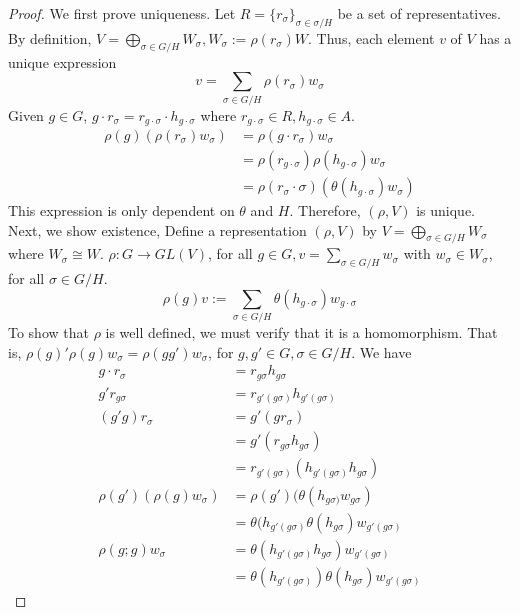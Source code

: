 \documentclass[letterpaper, leqno, 12pt]{article}
\newcommand {\repV} {(\rho,V)}
\theoremstyle{stdthm}
\theoremstyle{stddef}
\theoremstyle{stdnonum}
\theoremstyle{stdqands}
\theoremstyle{stdbold}
\begin{document}
\begin{proof}
We first prove uniqueness. Let $R = \{r_\sigma\}_{\sigma \in \sigma/H}$ be a set of representatives. By definition, $V = \bigoplus_{\sigma \in G/H} W_\sigma, W_\sigma := \rho(r_\sigma)W$. Thus, each element $v$ of $V$ has a unique expression
 \[ v = \sum_{\sigma \in G/H} \rho(r_\sigma) w_\sigma \]
Given $g \in G$, $g\cdot r_\sigma = r_{g\cdot \sigma} \cdot h_{g \cdot \sigma}$ where $r_{g\cdot \sigma} \in R, h_{g\cdot \sigma} \in A$.  
\begin{align*}
\rho(g)(\rho(r_\sigma)w_\sigma)  &= \rho(g\cdot r_\sigma) w_\sigma\\
&= \rho(r_{g\cdot \sigma}) \rho(h_{g\cdot \sigma}) w_\sigma\\
&= \rho(r_\sigma\cdot \sigma) (\theta (h_{g \cdot \sigma}) w_\sigma)
\end{align*}
This expression is only dependent on $\theta$ and $H$. Therefore, $\repV$ is unique. \\

\noindent Next, we show existence, Define a representation $\repV$ by $V = \bigoplus_{\sigma \in G/H}W_\sigma$ where $W_\sigma \cong W$.  $\rho: G \rightarrow GL(V)$, for all $g\in G, v = \sum_{\sigma \in G/H} w_\sigma$ with $w_\sigma \in W_\sigma$, for all $\sigma \in G/H$. 
\[ \rho(g) v := \sum_{\sigma \in G/H} \theta (h_{g\cdot \sigma}) w_{g \cdot \sigma}\]
To show that $\rho$ is well defined, we must verify that it is a homomorphism. That is, $\rho(g)'\rho(g)w_\sigma = \rho(gg')w_\sigma$, for $g,g' \in G, \sigma \in G/H$. We have 
\begin{align*}
g\cdot r_\sigma &= r_{g\sigma} h_{g\sigma}\\
g' r_{g\sigma} &= r_{g'(g\sigma)} h_{g'(g\sigma)}\\
(g'g) r_\sigma &= g'(g r_\sigma)\\
&= g'(r_{g\sigma} h_{g\sigma})\\
&= r_{g'(g\sigma)} (h_{g'(g\sigma)}h_{g\sigma})\\
\rho(g')(\rho(g)w_\sigma) &= \rho(g') (\theta (h_{g\sigma)}w_{g\sigma})\\
&= \theta(h_{g'(g\sigma)} \theta(h_{g\sigma}) w_{g'(g\sigma)}\\
\rho(g;g) w_\sigma&= \theta(h_{g'(g\sigma)} h_{g\sigma}) w_{g'(g\sigma)}\\
&= \theta(h_{g'(g\sigma)})\theta(h_{g\sigma}) w_{g'(g\sigma)}
\end{align*}

\end{proof}
\end{document}
